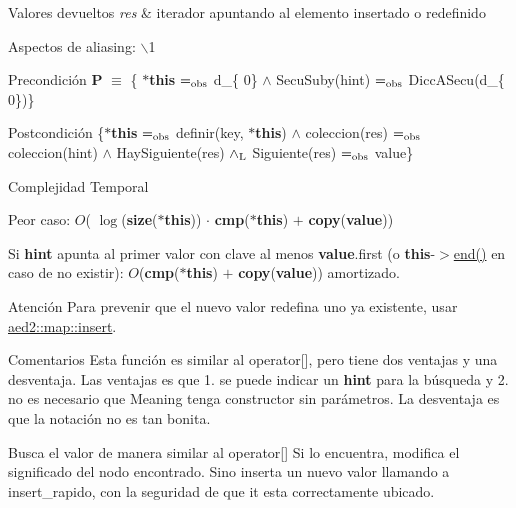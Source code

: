 \begin{DoxyRetVals}{\-Valores devueltos}
{\em res} & iterador apuntando al elemento insertado o redefinido\\
\hline
\end{DoxyRetVals}
\begin{DoxyParagraph}{\-Aspectos de aliasing\-:}
$\backslash$1
\end{DoxyParagraph}
\begin{DoxyPrecond}{\-Precondición}
{\bfseries \-P} $\equiv$ \{ {\bfseries $\ast$this} $=_{\rm obs}$ d\-\_\-\{ 0\} $\land$ \-Secu\-Suby(hint) $=_{\rm obs}$ \-Dicc\-A\-Secu(d\-\_\-\{ 0\})\} 
\end{DoxyPrecond}
\begin{DoxyPostcond}{\-Postcondición}
\{{\bfseries $\ast$this} $=_{\rm obs}$ definir(key, {\bfseries $\ast$this}) $\land$ coleccion(res) $=_{\rm obs}$ coleccion(hint) $\land$ \-Hay\-Siguiente(res) $\land_{\rm L}$ \-Siguiente(res) $=_{\rm obs}$ value\}
\end{DoxyPostcond}

\begin{DoxyDescription}
\item[\-Complejidad \-Temporal]
\begin{DoxyItemize}
\item \-Peor caso\-: $O$( $\log$({\bfseries size}({\bfseries $\ast$this})) $\cdot$ {\bfseries cmp}({\bfseries $\ast$this}) $+$ {\bfseries copy}({\bfseries value}))
\item \-Si {\bfseries hint} apunta al primer valor con clave al menos {\bfseries value}.first (o {\bfseries this}-\/$>$\hyperlink{classaed2_1_1map_a76023e6a56cb625513e1b5ea028bf983_a76023e6a56cb625513e1b5ea028bf983}{end()} en caso de no existir)\-: $O$({\bfseries cmp}({\bfseries $\ast$this}) $+$ {\bfseries copy}({\bfseries value})) amortizado. 
\end{DoxyItemize}
\end{DoxyDescription}

\begin{DoxyAttention}{\-Atención}
\-Para prevenir que el nuevo valor redefina uno ya existente, usar \hyperlink{classaed2_1_1map_a60aacba06b1579630b3c8e996cf248c8_a60aacba06b1579630b3c8e996cf248c8}{aed2\-::map\-::insert}. 
\end{DoxyAttention}
\begin{DoxyRemark}{\-Comentarios}
\-Esta función es similar al operator\mbox{[}\mbox{]}, pero tiene dos ventajas y una desventaja. \-Las ventajas es que 1. se puede indicar un {\bfseries hint} para la búsqueda y 2. no es necesario que \-Meaning tenga constructor sin parámetros. \-La desventaja es que la notación no es tan bonita.
\end{DoxyRemark}
\-Busca el valor de manera similar al operator\mbox{[}\mbox{]} \-Si lo encuentra, modifica el significado del nodo encontrado. \-Sino inserta un nuevo valor llamando a insert\-\_\-rapido, con la seguridad de que it esta correctamente ubicado. 


